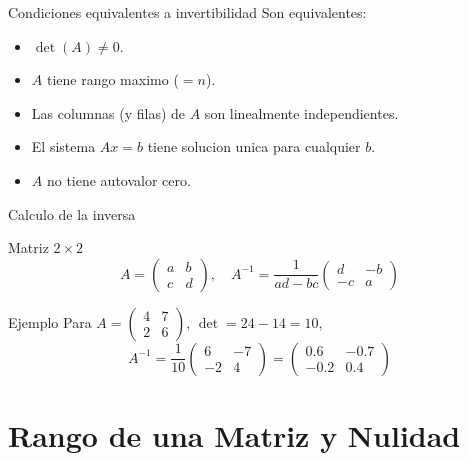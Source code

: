 \documentclass[aspectratio=169, 10pt, xcolor=table]{beamer}
\begin{document}
\begin{frame}{Condiciones equivalentes a invertibilidad}
    Son equivalentes:
    \begin{itemize}
        \item $\det(A) \neq 0$.
        \item $A$ tiene rango maximo ($=n$).
        \item Las columnas (y filas) de $A$ son linealmente independientes.
        \item El sistema $Ax=b$ tiene solucion unica para cualquier $b$.
        \item $A$ no tiene autovalor cero.
    \end{itemize}
\end{frame}

\begin{frame}{Calculo de la inversa}
    \begin{block}{Matriz $2\times2$}
        \[
        A = \begin{pmatrix}a&b\\c&d\end{pmatrix},\quad
        A^{-1} = \frac{1}{ad-bc}\begin{pmatrix}d&-b\\-c&a\end{pmatrix}
        \]
    \end{block}
    \begin{exampleblock}{Ejemplo}
        Para $A = \begin{pmatrix}4&7\\2&6\end{pmatrix}$, $\det = 24-14=10$,
        \[
        A^{-1} = \frac{1}{10}\begin{pmatrix}6&-7\\-2&4\end{pmatrix} = \begin{pmatrix}0.6&-0.7\\-0.2&0.4\end{pmatrix}
        \]
    \end{exampleblock}
\end{frame}

\section{Rango de una Matriz y Nulidad}
\end{document}

